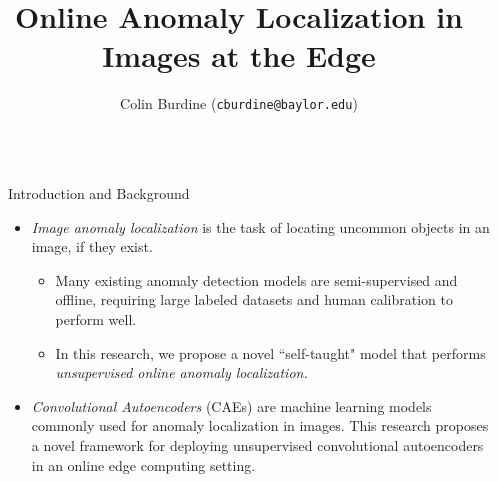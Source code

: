 \documentclass[final,hyperref={pdfpagelabels=false}]{beamer}
\title{\Huge Online Anomaly Localization in \\ Images at the Edge} %
\author{Colin Burdine \hspace{1cm} (\texttt{cburdine@baylor.edu})} %
\institute{SULI Intern $\mid$ Argonne National Laboratory $\mid$ MCS Division} %
\begin{document}

\begin{frame}[t] %

\begin{columns}[t] %

\begin{column}{.02\textwidth}\end{column} %

\begin{column}{.465\textwidth} %

            
\begin{block}{Introduction and Background}
\begin{itemize}
\item \textit{Image anomaly localization} is the task of locating uncommon objects in an image, if they exist.

\begin{itemize}
\item Many existing anomaly detection models are semi-supervised and offline, requiring large labeled datasets and human calibration to perform well.

\item In this research, we propose a novel ``self-taught" model that performs \textit{unsupervised online anomaly localization.}
\end{itemize}

\item \textit{Convolutional Autoencoders} (CAEs) are machine learning models commonly used for anomaly localization in images.  This research proposes a novel framework for deploying unsupervised convolutional autoencoders in an online edge computing setting.\\[4mm]


\end{itemize}
\end{block}
\end{column}
\end{columns}
\end{frame}
\end{document}
